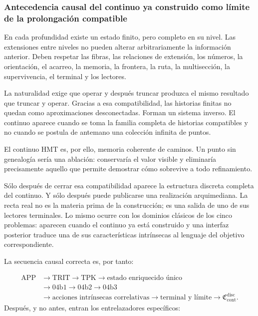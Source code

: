 \subsubsection{Antecedencia causal del continuo ya construido como límite de la prolongación compatible}
En cada profundidad existe un estado finito, pero completo en su nivel. Las extensiones entre niveles no pueden alterar arbitrariamente la información anterior. Deben respetar las fibras, las relaciones de extensión, los números, la orientación, el acarreo, la memoria, la frontera, la ruta, la multisección, la supervivencia, el terminal y los lectores.\par
La naturalidad exige que operar y después truncar produzca el mismo resultado que truncar y operar. Gracias a esa compatibilidad, las historias finitas no quedan como aproximaciones desconectadas. Forman un sistema inverso. El continuo aparece cuando se toma la familia completa de historias compatibles y no cuando se postula de antemano una colección infinita de puntos.\par
El continuo HMT es, por ello, memoria coherente de caminos. Un punto sin genealogía sería una ablación: conservaría el valor visible y eliminaría precisamente aquello que permite demostrar cómo sobrevive a todo refinamiento.\par
Sólo después de cerrar esa compatibilidad aparece la estructura discreta completa del continuo. Y sólo después puede publicarse una realización arquimediana. La recta real no es la materia prima de la construcción; es una salida de uno de sus lectores terminales. Lo mismo ocurre con los dominios clásicos de los cinco problemas: aparecen cuando el continuo ya está construido y una interfaz posterior traduce una de sus características intrínsecas al lenguaje del objetivo correspondiente.\par
La secuencia causal correcta es, por tanto:\par
\[
\begin{aligned}
\mathrm{APP}
&\longrightarrow \mathrm{TRIT}
\longrightarrow \mathrm{TPK}
\longrightarrow \text{estado enriquecido único}\\
&\longrightarrow 04\mathrm b1
\longrightarrow 04\mathrm b2
\longrightarrow 04\mathrm b3\\
&\longrightarrow \text{acciones intrínsecas correlativas}
\longrightarrow \text{terminal y límite}
\longrightarrow \mathfrak C_{\mathrm{cont}}^{\mathrm{disc}}.
\end{aligned}
\]
Después, y no antes, entran los entrelazadores específicos:\par
